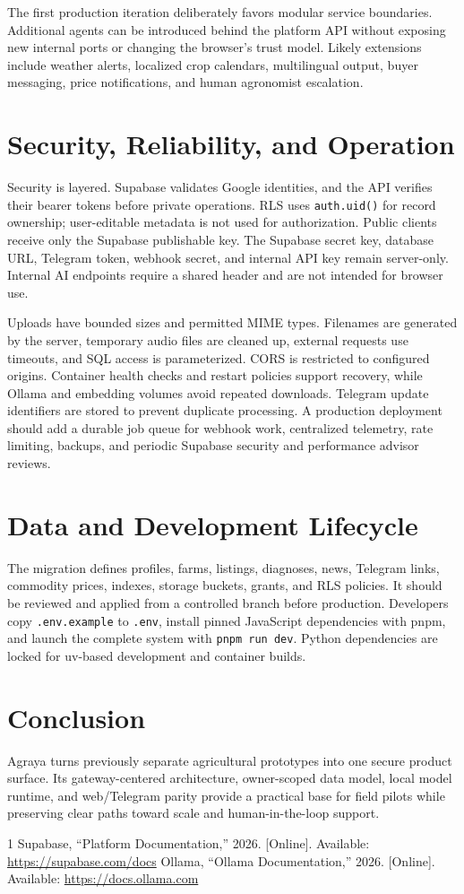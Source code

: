 \documentclass[10pt,journal]{IEEEtran}
\begin{document}
The first production iteration deliberately favors modular service boundaries.
Additional agents can be introduced behind the platform API without exposing new
internal ports or changing the browser's trust model. Likely extensions include
weather alerts, localized crop calendars, multilingual output, buyer messaging,
price notifications, and human agronomist escalation.

\newpage
\section{Security, Reliability, and Operation}
Security is layered. Supabase validates Google identities, and the API verifies
their bearer tokens before private operations. RLS uses \texttt{auth.uid()} for
record ownership; user-editable metadata is not used for authorization. Public
clients receive only the Supabase publishable key. The Supabase secret key,
database URL, Telegram token, webhook secret, and internal API key remain
server-only. Internal AI endpoints require a shared header and are not intended
for browser use.

Uploads have bounded sizes and permitted MIME types. Filenames are generated by
the server, temporary audio files are cleaned up, external requests use timeouts,
and SQL access is parameterized. CORS is restricted to configured origins.
Container health checks and restart policies support recovery, while Ollama and
embedding volumes avoid repeated downloads. Telegram update identifiers are
stored to prevent duplicate processing. A production deployment should add a
durable job queue for webhook work, centralized telemetry, rate limiting, backups,
and periodic Supabase security and performance advisor reviews.

\section{Data and Development Lifecycle}
The migration defines profiles, farms, listings, diagnoses, news, Telegram links,
commodity prices, indexes, storage buckets, grants, and RLS policies. It should be
reviewed and applied from a controlled branch before production. Developers copy
\texttt{.env.example} to \texttt{.env}, install pinned JavaScript dependencies
with pnpm, and launch the complete system with \texttt{pnpm run dev}. Python
dependencies are locked for uv-based development and container builds.

\section{Conclusion}
Agraya turns previously separate agricultural prototypes into one secure product
surface. Its gateway-centered architecture, owner-scoped data model, local model
runtime, and web/Telegram parity provide a practical base for field pilots while
preserving clear paths toward scale and human-in-the-loop support.

\begin{thebibliography}{1}
 Supabase, ``Platform Documentation,'' 2026. [Online]. Available: \url{https://supabase.com/docs}
 Ollama, ``Ollama Documentation,'' 2026. [Online]. Available: \url{https://docs.ollama.com}
\end{thebibliography}
\end{document}

